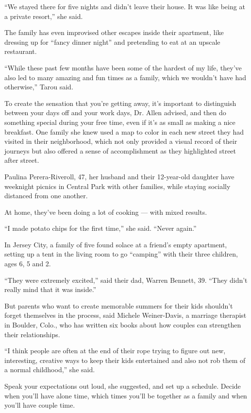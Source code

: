 ``We stayed there for five nights and didn't leave their house. It was
like being at a private resort,'' she said.

The family has even improvised other escapes inside their apartment,
like dressing up for ``fancy dinner night'' and pretending to eat at an
upscale restaurant.

``While these past few months have been some of the hardest of my life,
they've also led to many amazing and fun times as a family, which we
wouldn't have had otherwise,'' Tarou said.

To create the sensation that you're getting away, it's important to
distinguish between your days off and your work days, Dr. Allen advised,
and then do something special during your free time, even if it's as
small as making a nice breakfast. One family she knew used a map to
color in each new street they had visited in their neighborhood, which
not only provided a visual record of their journeys but also offered a
sense of accomplishment as they highlighted street after street.

Paulina Perera-Riveroll, 47, her husband and their 12-year-old daughter
have weeknight picnics in Central Park with other families, while
staying socially distanced from one another.

At home, they've been doing a lot of cooking --- with mixed results.

``I made potato chips for the first time,'' she said. ``Never again.''

In Jersey City, a family of five found solace at a friend's empty
apartment, setting up a tent in the living room to go ``camping'' with
their three children, ages 6, 5 and 2.

``They were extremely excited,'' said their dad, Warren Bennett, 39.
``They didn't really mind that it was inside.''

But parents who want to create memorable summers for their kids
shouldn't forget themselves in the process, said Michele Weiner-Davis, a
marriage therapist in Boulder, Colo., who has written six books about
how couples can strengthen their relationships.

``I think people are often at the end of their rope trying to figure out
new, interesting, creative ways to keep their kids entertained and also
not rob them of a normal childhood,'' she said.

Speak your expectations out loud, she suggested, and set up a schedule.
Decide when you'll have alone time, which times you'll be together as a
family and when you'll have couple time.

